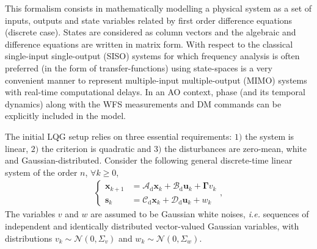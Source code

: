 \documentclass[a4paper,12pt]{article}
\newcommand{\0}{\mathsf{0}} %
\newcommand{\tur}{\mathsf{\tiny{tur}}}
\newcommand{\crit}{\mathsf{\tiny{crit}}}
\newcommand{\Vd}{\boldsymbol{\Gamma}}
\newcommand{\phivec}{{\boldsymbol{\psi}}}
\newcommand{\svec}{{\mathbf{s}}}
\newcommand{\xvec}{{\mathbf{x}}}
\newcommand{\uvec}{{\mathbf{u}}}
\begin{document}
        This formalism
        consists in mathematically modelling a
        physical system as a set of inputs, outputs and state variables
        related by first order difference equations (discrete case). States are
        considered as column vectors and the algebraic and difference
        equations are written in matrix form. With respect to the classical
        single-input single-output (SISO) systems for which frequency
        analysis is often preferred (in the form of
        transfer-functions) using state-spaces is a very
        convenient manner to represent multiple-input multiple-output
        (MIMO) systems with real-time
        computational delays. In an AO context, phase (and its temporal
        dynamics) along with the WFS measurements and DM commands
        can be explicitly included in the model.


        The initial LQG setup relies on three essential requirements:
        $1)$ the system is linear, $2)$ the criterion is quadratic and
        $3)$ the disturbances are zero-mean, white and Gaussian-distributed.
        Consider the following general discrete-time linear system of
        the order $n$, $\forall k \geq 0$,   
        \begin{align}\label{eq:complete_discrete_state_space_system}
          \left\{
            \begin{array}{cl}
              \xvec_{k+1}  &  =\mathcal{A}_{\mathrm{d}}\xvec_{k}+\mathcal{B}_{\mathrm{d}} \uvec_{k}+\Vd v_{k}\\
              \svec_{k} & = \mathcal{C}_{\mathrm{d}} \xvec_{k} + \mathcal{D}_{\mathrm{d}} \uvec_{k} + w_k %
            \end{array}\right. ,
        \end{align}
        The variables $v$ and $w$ are assumed to be 
        Gaussian white noises, \emph{i.e.} sequences of independent and identically 
        distributed vector-valued Gaussian variables, with distributions $v_k 
        \sim \mathcal{N}(0,\Sigma_v)$ and $w_k \sim
\mathcal{N}(0,\Sigma_w)$. 
\end{document}
